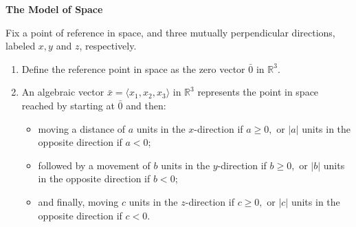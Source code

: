 \begin{definitionbox}
\textbf{The Model of Space}

Fix a point of reference in space, and three mutually perpendicular
directions, labeled $x, y$ and $z$, respectively.
\begin{enumerate}
  \item Define the reference point in space as the zero vector $\bar{0}$ in $\mathbb{R}^3$.
  
  \item An algebraic vector $\bar{x} = \langle x_1, x_2, x_3 \rangle$ in $\mathbb{R}^3$ represents the point in space
        reached by starting at $\bar{0}$ and then:
        \begin{itemize}
          \item moving a distance of $a$ units in the $x$-direction if $a \geq 0,$ or $|a|$ units in the opposite direction if $a < 0$;
          \item followed by a movement of $b$ units in the $y$-direction if $b \geq 0,$ or $|b|$ units in the opposite direction if $b < 0$;
          \item and finally, moving $c$ units in the $z$-direction if $c \geq 0,$ or $|c|$ units in the opposite direction if $c < 0$.
        \end{itemize}
\end{enumerate}
\end{definitionbox}


\begin{center}
\end{center}

